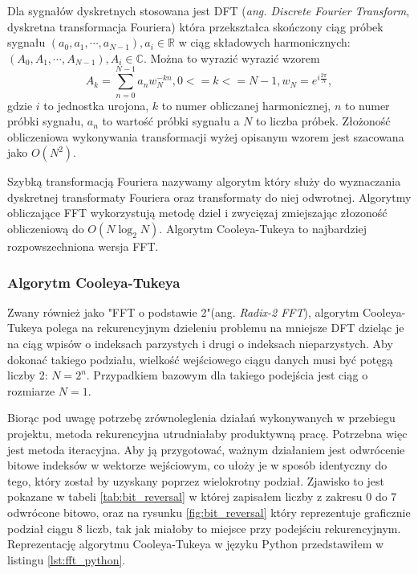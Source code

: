 \documentclass[a4paper,12pt]{book} %
\begin{document}
Dla sygnałów dyskretnych stosowana jest DFT (\emph{ang. Discrete Fourier Transform}, dyskretna transformacja Fouriera) która przekształca skończony ciąg próbek sygnału $(a_0,a_1,\cdots,a_{N-1}), a_i \in \mathbb{R}$ w ciąg składowych harmonicznych: $(A_0,A_1,\cdots,A_{N-1}),A_i \in \mathbb{C}.$
Można to wyrazić wyrazić wzorem
$$A_k=\sum_{n=0}^{N-1}a_nw_N^{-kn}, 0 <= k <= N-1,
w_N = e^{i\frac{2\pi}{N}},$$
gdzie $i$ to jednostka urojona, $k$ to numer obliczanej harmonicznej, $n$ to numer próbki sygnału, $a_n$ to wartość próbki sygnału a $N$ to liczba próbek. Złożoność obliczeniowa wykonywania transformacji wyżej opisanym wzorem jest szacowana jako $O(N^2)$.

Szybką transformacją Fouriera nazywamy algorytm który służy do wyznaczania dyskretnej transformaty Fouriera oraz transformaty do niej odwrotnej. Algorytmy obliczające FFT wykorzystują metodę dziel i zwycięzaj zmiejszając złozoność obliczeniową do $O(N\log_2N)$. Algorytm Cooleya-Tukeya to najbardziej rozpowszechniona wersja FFT.

\subsubsection{Algorytm Cooleya-Tukeya}
Zwany również jako "FFT o podstawie 2"(ang. \emph{Radix-2 FFT}), algorytm Cooleya-Tukeya polega na rekurencyjnym dzieleniu problemu na mniejsze DFT dzieląc je na ciąg wpisów o indeksach parzystych i drugi o indeksach nieparzystych.\cite{CooleyTukey} Aby dokonać takiego podziału, wielkość wejściowego ciągu danych musi być potęgą liczby 2: $N = 2^n.$ Przypadkiem bazowym dla takiego podejścia jest ciąg o rozmiarze $N = 1.$

Biorąc pod uwagę potrzebę zrównoleglenia działań wykonywanych w przebiegu projektu, metoda rekurencyjna utrudniałaby produktywną pracę. Potrzebna więc jest metoda iteracyjna. Aby ją przygotować, ważnym działaniem jest odwrócenie bitowe indeksów w wektorze wejściowym, co ułoży je w sposób identyczny do tego, który został by uzyskany poprzez wielokrotny podział. Zjawisko to jest pokazane w tabeli \ref{tab:bit_reversal} w której zapisałem liczby z zakresu 0 do 7 odwrócone bitowo, oraz na rysunku \ref{fig:bit_reversal} który reprezentuje graficznie podział ciągu 8 liczb, tak jak miałoby to miejsce przy podejściu rekurencyjnym. Reprezentację algorytmu Cooleya-Tukeya w języku Python przedstawiłem w listingu \ref{lst:fft_python}.
\end{document}
